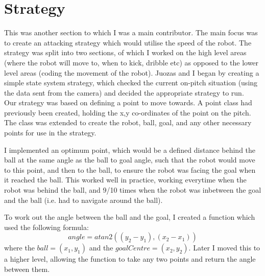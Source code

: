 \documentclass[12pt]{IEEEtran}
\begin{document}
\section{Strategy}

This was another section to which I was a main contributor. The main focus was to create an attacking strategy which would utilise the speed of the robot. The strategy was split into two sections, of which I worked on the high level areas (where the robot will move to, when to kick, dribble etc) as opposed to the lower level areas (coding the movement of the robot). Juozas and I began by creating a simple state system strategy, which checked the current on-pitch situation (using the data sent from the camera) and decided the appropriate strategy to run. \\

Our strategy was based on defining a point to move towards. A point class had previously been created, holding the x,y co-ordinates of the point on the pitch. The class was extended to create the robot, ball, goal, and any other necessary points for use in the strategy. 

I implemented an optimum point, which would be a defined distance behind the ball at the same angle as the ball to goal angle, such that the robot would move to this point, and then to the ball, to ensure the robot was facing the goal when it reached the ball. This worked well in practice, working everytime when the robot was behind the ball, and 9/10 times when the robot was inbetween the goal and the ball (i.e. had to navigate around the ball).

To work out the angle between the ball and the goal, I created a function which used the following formula: \[angle = atan2( (y_{2} - y_{1}), (x_{2} - x_{1}) ) \] where the $ball = (x_{1}, y_{1})$ and the $goal Centre = (x_{2}, y_{2})$.
Later I moved this to a higher level, allowing the function to take any two points and return the angle between them. \\
\end{document}
